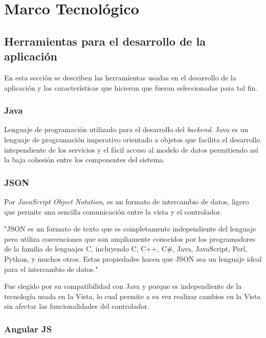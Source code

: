 \chapter{Marco Tecnológico}
    \section{Herramientas para el desarrollo de la aplicación}
    
    En esta sección se describen las herramientas usadas en el desarrollo de la aplicación y las características que hicieron que fueran seleccionadas para tal fin.
    
        \subsection{Java}
        
        Lenguaje de programación utilizado para el desarrollo del \textit{backend}. Java es un lenguaje de programación imperativo orientado a objetos que facilita el desarrollo intependiente de los servicios y el fácil acceso al modelo de datos permitiendo así la baja cohesión entre los componentes del sistema.
        
        \subsection{JSON}
        
        Por \textit{JavaScript Object Notation}, es un formato de intercambio de datos, ligero\cite{JSON-yahoo} que permite una sencilla comunicación entre la vista y el controlador.
        
        "JSON es un formato de texto que es completamente independiente del lenguaje pero utiliza convenciones que son ampliamente conocidos por los programadores de la familia de lenguajes C, incluyendo C, C++, C\#, Java, JavaScript, Perl, Python, y muchos otros. Estas propiedades hacen que JSON sea un lenguaje ideal para el intercambio de datos\cite{JSON-jsonOrg}."
        
        Fue elegido por su compatibilidad con Java y porque es independiente de la tecnología usada en la Vista, lo cual permite a su vez realizar cambios en la Vista sin afectar las funcionalidades del controlador.
        
        \subsection{Angular JS}
        
